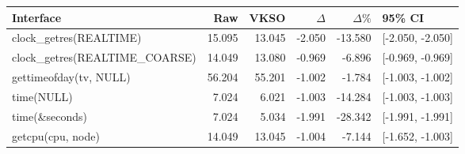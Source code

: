 \begin{tabular}{lrrrrl}
\toprule
Interface & Raw & VKSO & $\Delta$ & $\Delta\%$ & 95\% CI \\
\midrule
clock\_getres(REALTIME) & 15.095 & 13.045 & -2.050 & -13.580 & [-2.050, -2.050] \\
clock\_getres(REALTIME\_COARSE) & 14.049 & 13.080 & -0.969 & -6.896 & [-0.969, -0.969] \\
gettimeofday(tv, NULL) & 56.204 & 55.201 & -1.002 & -1.784 & [-1.003, -1.002] \\
time(NULL) & 7.024 & 6.021 & -1.003 & -14.284 & [-1.003, -1.003] \\
time(\&seconds) & 7.024 & 5.034 & -1.991 & -28.342 & [-1.991, -1.991] \\
getcpu(cpu, node) & 14.049 & 13.045 & -1.004 & -7.144 & [-1.652, -1.003] \\
\bottomrule
\end{tabular}
